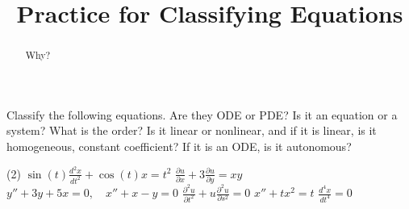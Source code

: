\documentclass{ximera}
\title{Practice for Classifying Equations}
\begin{document}
\begin{abstract}
    Why?
\end{abstract}
\maketitle


\begin{exercise}
    Classify the following equations.  Are they ODE or PDE\@?  Is it an equation or a system?  What is the order?  Is it linear or nonlinear, and if it is linear, is it homogeneous, constant coefficient?  If it is an ODE\@, is it autonomous?
    \begin{tasks}(2)
        \task $\displaystyle \sin(t) \frac{d^2 x}{dt^2} + \cos(t) x = t^2$
        \task $\displaystyle \frac{\partial u}{\partial x} + 3 \frac{\partial u}{\partial y} = xy$
        \task $\displaystyle y''+3y+5x=0, \quad x''+x-y=0$
        \task $\displaystyle \frac{\partial^2 u}{\partial t^2} + u\frac{\partial^2 u}{\partial s^2} = 0$
        \task $\displaystyle x''+tx^2=t$
        \task $\displaystyle \frac{d^4 x}{dt^4} = 0$
    \end{tasks}
\end{exercise}
\end{document}
